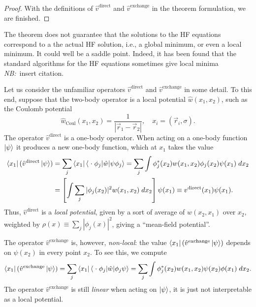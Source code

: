 \documentclass{report}
\theoremstyle{plain}
\theoremstyle{definition}
\newcommand{\note}[1]{{\color{red}\emph{NB:}~#1}}
\begin{document}
\begin{proof}
  With the definitions of $\hat{v}^\text{direct}$ and
  $\hat{v}^\text{exchange}$ in the theorem formulation, we are
  finished.
\end{proof}


The theorem does not guarantee that the solutions to the HF
equations correspond to a the actual HF solution, i.e., a global
minimum, or even a local minimum. It could well be a saddle
point. Indeed, it has been found that the standard algorithms for the
HF equations sometimes give local minima \note{insert citation}.

Let us consider the unfamiliar operators $\hat{v}^\text{direct}$ and
$\hat{v}^\text{exchange}$ in some detail. To this end, suppose that
the two-body operator is a local potential $\hat{w}(x_1,x_2)$, such as
the Coulomb potential
\begin{equation}
  \hat{w}_\text{Coul}(x_1,x_2) = \frac{1}{|\vec{r}_1 - \vec{r}_2|},
  \quad x_i = (\vec{r}_i,\sigma).
\end{equation}
The operator $\hat{v}^\text{direct}$ is a one-body operator. When
acting on a one-body function $\ket{\psi}$ it produces a new one-body
function, which at $x_1$ takes the value
\begin{equation}
  \begin{split}
    \bra{x_1}(\hat{v}^\text{direct}\ket{\psi}) &=
  \sum_j \bra{x_1}\braket{\;\cdot\; \phi_j|\hat{w}|\psi\phi_j} =
  \sum_j \int \phi_j^*(x_2) w(x_1,x_2) \phi_j(x_2) \psi(x_1) \; dx_2
  \\ &
  = \left[ \int \sum_j |\phi_j(x_2)|^2 w(x_1,x_2) \; dx_2\right] \psi(x_1)
  \equiv v^\text{direct}(x_1)\psi(x_1).
\end{split}
\end{equation}
Thus, $\hat{v}^\text{direct}$ is a \emph{local potential}, given by a
sort of average of $w(x_2,x_1)$ over $x_2$, weighted by $\rho(x)
\equiv \sum_j |\phi_j(x)|^2$, giving a
``mean-field potential''.

The operator $\hat{v}^\text{exchange}$ is, however,
\emph{non-local}: the value
$\bra{x_1}(\hat{v}^\text{exchange}\ket{\psi})$ depends on $\psi(x_2)$
in every point $x_2$. To see this, we compute
\begin{equation}
  \bra{x_1}(\hat{v}^\text{exchange}\ket{\psi}) =
  \sum_j \bra{x_1}\braket{\;\cdot\; \phi_j|\hat{w}|\phi_j\psi} =
  \sum_j \int \phi_j^*(x_2) w(x_1,x_2) \psi(x_2) \phi(x_1) \; dx_2.
\end{equation}
The operator $\hat{v}^\text{exchange}$ is still \emph{linear} when
acting on $\ket{\psi}$, it is just not interpretable as a local
potential.
\end{document}
